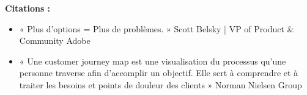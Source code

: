 \textbf{Citations :}

\begin{itemize}
\item « Plus d'options = Plus de problèmes. » Scott Belsky | VP of Product \& Community Adobe
\item « Une customer journey map est une visualisation du processus qu'une personne traverse afin d'accomplir un objectif. Elle sert à comprendre et à traiter les besoins et points de douleur des clients » Norman Nielsen Group
\end{itemize}

